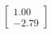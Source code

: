 \documentclass[preview]{standalone}
\begin{document}
\begin{align*}
\begin{bmatrix} 1.00 \\ -2.79 \end{bmatrix}
\end{align*}
\end{document}

